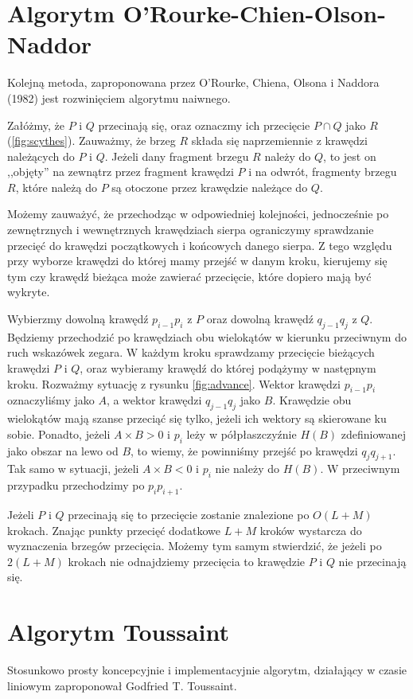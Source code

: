\section{Algorytm O'Rourke-Chien-Olson-Naddor}
Kolejną metoda, zaproponowana przez O'Rourke, Chiena, Olsona i
Naddora (1982) jest rozwinięciem algorytmu naiwnego.

Załóżmy, że $P$ i $Q$ przecinają się, oraz oznaczmy ich przecięcie $P
\cap Q$ jako $R$ (\ref{fig:scythes}). Zauważmy, że brzeg $R$ składa
się naprzemiennie z krawędzi należących do $P$ i $Q$. Jeżeli dany
fragment brzegu $R$ należy do $Q$, to jest on ,,objęty'' na zewnątrz
przez fragment krawędzi $P$ i na odwrót, fragmenty brzegu $R$, które
należą do $P$ są otoczone przez krawędzie należące do $Q$.

Możemy zauważyć, że przechodząc w odpowiedniej kolejności,
jednocześnie po zewnętrznych i wewnętrznych krawędziach sierpa
ograniczymy sprawdzanie przecięć do krawędzi początkowych i końcowych
danego sierpa. Z tego względu przy wyborze krawędzi do której mamy
przejść w danym kroku, kierujemy się tym czy krawędź bieżąca może
zawierać przecięcie, które dopiero mają być wykryte.

Wybierzmy dowolną krawędź $p_{i-1}p_{i}$ z $P$ oraz dowolną krawędź
$q_{j-1}q_{j}$ z $Q$. Będziemy przechodzić po krawędziach obu
wielokątów w kierunku przeciwnym do ruch wskazówek zegara. W każdym
kroku sprawdzamy przecięcie bieżących krawędzi $P$ i $Q$, oraz
wybieramy krawędź do której podążymy w następnym kroku. Rozważmy
sytuację z rysunku \ref{fig:advance}. Wektor krawędzi $p_{i-1}p_{i}$
oznaczyliśmy jako $A$, a wektor krawędzi $q_{j-1}q_{j}$ jako $B$.
Krawędzie obu wielokątów mają szanse przeciąć się tylko, jeżeli ich
wektory są skierowane ku sobie. Ponadto, jeżeli $A \times B > 0$ i
$p_{i}$ leży w półpłaszczyźnie $H(B)$ zdefiniowanej jako obszar na
lewo od $B$, to wiemy, że powinniśmy przejść po krawędzi
$q_{j}q_{j+1}$. Tak samo w sytuacji, jeżeli $A \times B < 0$ i $p_{i}$
nie należy do $H(B)$. W przeciwnym przypadku przechodzimy po
$p_{i}p_{i+1}$.

Jeżeli $P$ i $Q$ przecinają się to przecięcie zostanie znalezione po
$O(L+M)$ krokach. Znając punkty przecięć dodatkowe $L+M$ kroków
wystarcza do wyznaczenia brzegów przecięcia. Możemy tym samym
stwierdzić, że jeżeli po $2(L+M)$ krokach nie odnajdziemy przecięcia
to krawędzie $P$ i $Q$ nie przecinają się.

\section{Algorytm Toussaint}
Stosunkowo prosty koncepcyjnie i implementacyjnie algorytm, działający
w czasie liniowym zaproponował Godfried T. Toussaint.

